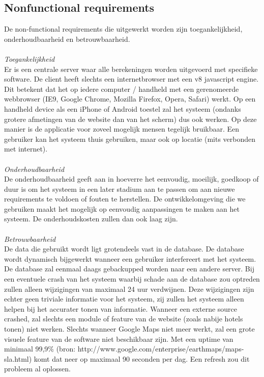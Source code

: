 \documentclass[a4paper,10pt]{article}
\begin{document}
		\subsection{Nonfunctional requirements}
			De non-functional requirements die uitgewerkt worden zijn toegankelijkheid, onderhoudbaarheid en betrouwbaarheid.\\	\\
			\textit{Toegankelijkheid}\\
			Er is een centrale server waar alle berekeningen worden uitgevoerd met specifieke software. De client heeft slechts een internetbrowser met een v8 javascript engine. Dit betekent dat het op iedere computer / handheld met een gerenomeerde webbrowser (IE9, Google Chrome, Mozilla Firefox, Opera, Safari) werkt. Op een handheld device als een iPhone of Android toestel zal het systeem (ondanks grotere afmetingen van de website dan van het scherm) dus ook werken. Op deze manier is de applicatie voor zoveel mogelijk mensen tegelijk bruikbaar. Een gebruiker kan het systeem thuis gebruiken, maar ook op locatie (mits verbonden met internet).\\ \\
			\textit{Onderhoudbaarheid}\\
			De onderhoudbaarheid geeft aan in hoeverre het eenvoudig, moeilijk, goedkoop of duur is om het systeem in een later stadium aan te passen om aan nieuwe requirements te voldoen of fouten te herstellen. De ontwikkelomgeving die we gebruiken maakt het mogelijk op eenvoudig aanpassingen te maken aan het systeem. De onderhoudskosten zullen dan ook laag zijn.\\ \\
			\textit{Betrouwbaarheid}\\
			De data die gebruikt wordt ligt grotendeels vast in de database. De database wordt dynamisch bijgewerkt wanneer een gebruiker interfereert met het systeem. De database zal eenmaal daags gebackupped worden naar een andere server. Bij een eventuele crash van het systeem waarbij schade aan de database zou optreden zullen alleen wijzigingen van maximaal 24 uur verdwijnen. Deze wijzigingen zijn echter geen triviale informatie voor het systeem, zij zullen het systeem alleen helpen bij het accurater tonen van informatie. Wanneer een externe source crashed, zal slechts een module of feature van de website (zoals nabije hotels tonen) niet werken. Slechts wanneer Google Maps niet meer werkt, zal een grote visuele feature van de software niet beschikbaar zijn. Met een uptime van minimaal 99,9\% (bron: http://www.google.com/enterprise/earthmaps/maps-sla.html) komt dat neer op maximaal 90 seconden per dag. Een refresh zou dit probleem al oplossen.
			
\end{document}
